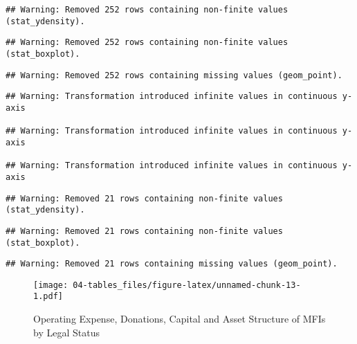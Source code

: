 \documentclass[a4paper,nobind]{templates/ociamthesis}
\newenvironment{Shaded}{\begin{snugshade}}{\end{snugshade}}
\newcommand{\AttributeTok}[1]{\textcolor[rgb]{0.77,0.63,0.00}{#1}}
\newcommand{\FunctionTok}[1]{\textcolor[rgb]{0.00,0.00,0.00}{#1}}
\newcommand{\NormalTok}[1]{#1}
\newcommand{\OtherTok}[1]{\textcolor[rgb]{0.56,0.35,0.01}{#1}}
\newcommand{\SpecialCharTok}[1]{\textcolor[rgb]{0.00,0.00,0.00}{#1}}
\newcommand{\StringTok}[1]{\textcolor[rgb]{0.31,0.60,0.02}{#1}}
\renewenvironment{Shaded}
{
  \vspace{10pt}%
  \begin{snugshade}%
}{%
  \end{snugshade}%
  \vspace{8pt}%
}
\begin{document}
\begin{landscape}
\begin{verbatim}
## Warning: Removed 252 rows containing non-finite values (stat_ydensity).
\end{verbatim}

\begin{verbatim}
## Warning: Removed 252 rows containing non-finite values (stat_boxplot).
\end{verbatim}

\begin{verbatim}
## Warning: Removed 252 rows containing missing values (geom_point).
\end{verbatim}

\begin{verbatim}
## Warning: Transformation introduced infinite values in continuous y-axis

## Warning: Transformation introduced infinite values in continuous y-axis

## Warning: Transformation introduced infinite values in continuous y-axis
\end{verbatim}

\begin{verbatim}
## Warning: Removed 21 rows containing non-finite values (stat_ydensity).
\end{verbatim}

\begin{verbatim}
## Warning: Removed 21 rows containing non-finite values (stat_boxplot).
\end{verbatim}

\begin{verbatim}
## Warning: Removed 21 rows containing missing values (geom_point).
\end{verbatim}

\begin{figure}
\centering
\texttt{[image: 04-tables\_files/figure-latex/unnamed-chunk-13-1.pdf]}
\caption{\label{fig:unnamed-chunk-13}Operating Expense, Donations, Capital and Asset Structure of MFIs by Legal Status}
\end{figure}

\newpage

\begin{Shaded}
\end{Shaded}


\end{landscape}
\end{document}

